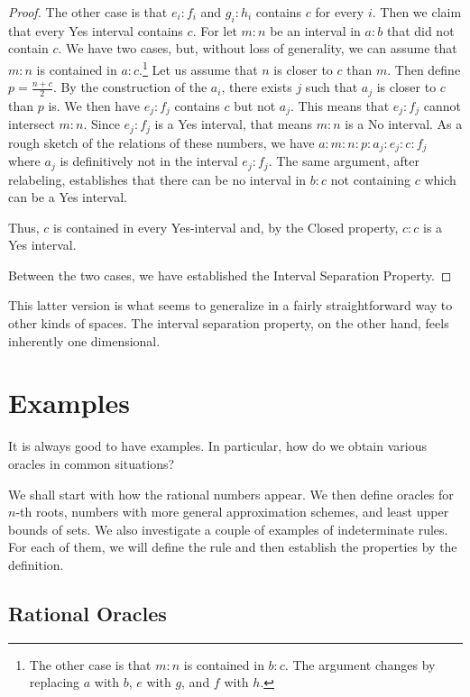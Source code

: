 \documentclass[12pt]{article}
\theoremstyle{remark}
\begin{document}
\begin{proof}
    The other case is that $e_i:f_i$ and $g_i:h_i$ contains $c$ for every $i$. Then we claim that every Yes interval contains $c$. For let $m:n$ be an interval in $a:b$ that did not contain $c$. We have two cases, but, without loss of generality, we can assume that $m:n$ is contained in $a:c$.\footnote{The other case is that $m:n$ is contained in $b:c$. The argument changes by replacing $a$ with $b$, $e$ with $g$, and $f$ with $h$.} Let us assume that $n$ is closer to $c$ than $m$. Then define $p =\frac{n+c}{2}$. By the construction of the $a_i$, there exists $j$ such that $a_j$ is closer to $c$ than $p$ is. We then have $e_j:f_j$ contains $c$ but not $a_j$. This means that $e_j:f_j$ cannot intersect $m:n$. Since $e_j:f_j$ is a Yes interval, that means $m:n$ is a No interval. As a rough sketch of the relations of these numbers, we have $a:m:n:p:a_j:e_j:c:f_j$ where $a_j$ is definitively not in the interval $e_j:f_j$. The same argument, after relabeling, establishes that there can be no interval in $b:c$ not containing $c$ which can be a Yes interval. 

    Thus, $c$ is contained in every Yes-interval and, by the Closed property, $c:c$ is a Yes interval. 

    Between the two cases, we have established the Interval Separation Property. 
\end{proof}

This latter version is what seems to generalize in a fairly straightforward way to other kinds of spaces. The interval separation property, on the other hand, feels inherently one dimensional. 

\section{Examples}

It is always good to have examples. In particular, how do we obtain various oracles in common situations? 

We shall start with how the rational numbers appear. We then define oracles for $n$-th roots,  numbers with more general approximation schemes, and least upper bounds of sets. We also investigate a couple of examples of indeterminate rules. For each of them, we will define the rule and then establish the properties by the definition. 

\subsection{Rational Oracles}
\end{document}
